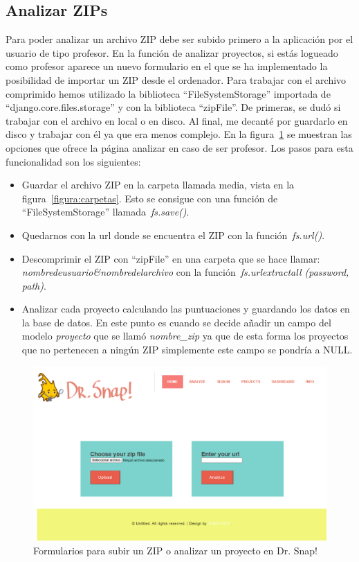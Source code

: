 \documentclass[a4paper, 12pt]{book}
\begin{document}
\subsection{Analizar ZIPs}
Para poder analizar un archivo ZIP debe ser subido primero a la aplicación por el usuario de tipo profesor. En la función de analizar proyectos, si estás logueado como profesor aparece un nuevo formulario en el que se ha implementado la posibilidad de importar un ZIP desde el ordenador. Para trabajar con el archivo comprimido hemos utilizado la biblioteca ``FileSystemStorage'' importada de ``django.core.files.storage'' y con la biblioteca ``zipFile''. De primeras, se dudó si trabajar con el archivo en local o en disco. Al final, me decanté por guardarlo en disco y trabajar con él ya que era menos complejo. En la figura~\ref{figura:zip} se muestran las opciones que ofrece la página analizar en caso de ser profesor. Los pasos para esta funcionalidad son los siguientes:
\begin{itemize}
    \item Guardar el archivo ZIP en la carpeta llamada media, vista en la figura~\ref{figura:carpetas}. Esto se consigue con una función de ``FileSystemStorage'' llamada~\textit{fs.save()}.
    \item Quedarnos con la url donde se encuentra el ZIP con la función~\textit{fs.url()}.
    \item Descomprimir el ZIP con ``zipFile'' en una carpeta que se hace llamar: \textit{nombredeusuario\&nombredelarchivo } con la función~\textit{fs.urlextractall (password, path)}.
    \item Analizar cada proyecto calculando las puntuaciones y guardando los datos en la base de datos. En este punto es cuando se decide añadir un campo del modelo \textit{proyecto} que se llamó \textit{nombre\_zip} ya que de esta forma los proyectos que no pertenecen a ningún ZIP simplemente este campo se pondría a NULL.
\end{itemize}
\begin{figure}[h]
\centering
            \includegraphics[scale=0.35]{img/zip.PNG}
            \caption{Formularios para subir un ZIP o analizar un proyecto en Dr. Snap!}
            \label{figura:zip}
    \end{figure}
\end{document}
